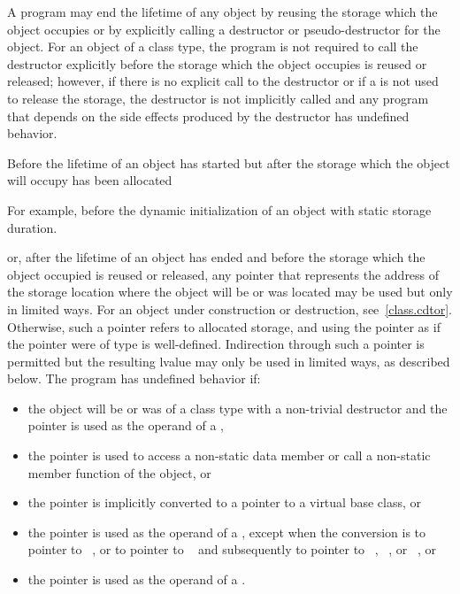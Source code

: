 \pnum
A program may end the lifetime of any object by reusing the storage
which the object occupies or by explicitly calling a destructor
or pseudo-destructor for the object.
For an object of a class type, the program is not required to
call the destructor explicitly before the storage which the object
occupies is reused or released; however, if there is no explicit call to
the destructor or if a 
is not used to release the storage, the destructor is not
implicitly called and any program that depends on the side effects
produced by the destructor has undefined behavior.

\pnum
Before the lifetime of an object has started but after the storage which
the object will occupy has been allocated
\begin{footnote}
For example, before the dynamic initialization of
an object with static storage duration.

\end{footnote}
or, after the lifetime of an object has ended and before the storage
which the object occupied is reused or released, any pointer that represents the address of
the storage location where the object will be or was located may be
used but only in limited ways.
For an object under construction or destruction, see~\ref{class.cdtor}.
Otherwise, such
a pointer refers to allocated
storage, and using the pointer as
if the pointer were of type  is
well-defined. Indirection through such a pointer is permitted but the resulting lvalue may only be used in
limited ways, as described below. The
program has undefined behavior if:
\begin{itemize}
\item
  the object will be or was of a class type with a non-trivial destructor
  and the pointer is used as the operand of a ,
\item
  the pointer is used to access a non-static data member or call a
  non-static member function of the object, or
\item
  the pointer is implicitly converted to a pointer
  to a virtual base class, or
\item
  the pointer is used as the operand of a
  , except when the conversion
  is to pointer to \cv{}~, or to pointer to \cv{}~
  and subsequently to pointer to
  \cv{}~,
  \cv{}~, or
  \cv{}~, or
\item
  the pointer is used as the operand of a
  .
\end{itemize}
